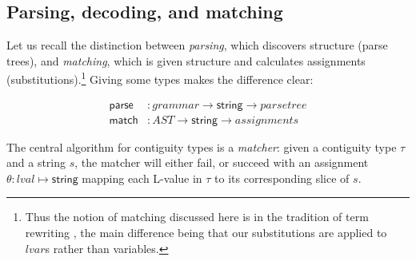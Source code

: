 \documentclass[svgnames]{llncs}
\newcommand{\konst}[1]{\ensuremath{\mathsf{#1}}}
\begin{document}
\subsection{Parsing, decoding, and matching}

Let us recall the distinction between \emph{parsing}, which discovers
structure (parse trees), and \emph{matching}, which is given structure
and calculates assignments (substitutions).\footnote{Thus the notion
  of matching discussed here is in the tradition of term rewriting
  \cite{nipkow-trs-book}, the main difference being that our
  substitutions are applied to $\mathit{lvar}$s rather than
  variables.} Giving some types makes the difference clear:

\begin{align*}
  \konst{parse} &: \mathit{grammar} \to \konst{string} \to \mathit{parse tree} \\
  \konst{match} &: \mathit{AST} \to \konst{string} \to \mathit{assignments}
\end{align*}

The central algorithm for contiguity types is a \emph{matcher}: given a
contiguity type $\tau$ and a string $s$, the matcher will either fail,
or succeed with an assignment $\theta : \mathit{lval} \mapsto
\konst{string}$ mapping each L-value in $\tau$ to its corresponding
slice of $s$.
\end{document}
